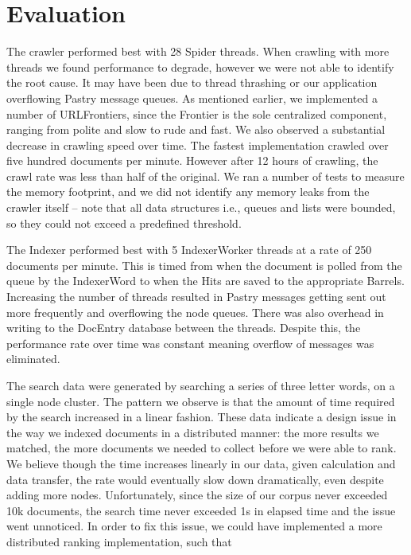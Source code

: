 \documentclass[11pt, letterpaper, oneside, twocolumn]{article}
\begin{document}
\section{Evaluation}
\label{sec:evaluation}

The crawler  performed best with  28 Spider threads. When  crawling with
more threads we  found performance to degrade, however we  were not able
to identify the root cause. It may  have been due to thread thrashing or
our application overflowing Pastry message queues. As mentioned earlier,
we implemented a number of URLFrontiers,  since the Frontier is the sole
centralized component, ranging from polite and slow to rude and fast. We
also  observed a  substantial  decrease in crawling  speed over time.
The fastest implementation crawled over five hundred documents per
minute. However after 12 hours of crawling, the crawl rate was less than half of
the original. We ran a number of tests to measure the memory footprint,
and we did not identify any memory leaks from the crawler itself -- note
that all  data structures i.e., queues  and lists were bounded,  so they
could not exceed a predefined threshold.

The Indexer performed best with 5 IndexerWorker threads at a rate of 250 documents per minute. 
This is timed from when the document is polled from the queue by the IndexerWord to when the Hits are saved to the appropriate Barrels. 
Increasing the number of threads resulted in Pastry messages getting sent out more frequently and overflowing the node queues. 
There was also overhead in writing to the DocEntry database between the threads. 
Despite this, the performance rate over time was constant meaning overflow of messages was eliminated. 

The search data were generated by searching a series of three letter words, on a single node cluster.
The pattern we observe is that the amount of time required by the search increased in a linear fashion.
These data indicate a design issue in the way we indexed documents in a distributed manner: the more results we matched, the more documents we needed to collect before we were able to rank.
We believe though the time increases linearly in our data, given calculation and data transfer, the rate would eventually slow down dramatically, even despite adding more nodes.
Unfortunately, since the size of our corpus never exceeded 10k documents, the search time never exceeded 1s in elapsed time and the issue went unnoticed.
In order to fix this issue, we could have implemented a more distributed ranking implementation, such that 
\end{document}
